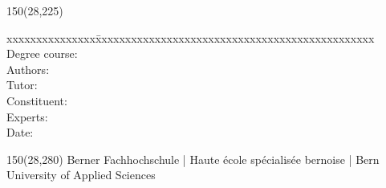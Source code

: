 \begin{titlepage}
\begin{flushleft}
\begin{textblock}{150}(28,225)
\fontsize{10pt}{17pt}\selectfont
\begin{tabbing}
xxxxxxxxxxxxxxx\=xxxxxxxxxxxxxxxxxxxxxxxxxxxxxxxxxxxxxxxxxxxxxxx \kill
Degree course:		\\		%
Authors:				\\					%
Tutor:			\\							%
Constituent:	\> [Wwwww AG]					\\							%
Experts:						\\							%
Date:			\> \versiondate					\\							%
\end{tabbing}

\end{textblock}
\end{flushleft}

\begin{textblock}{150}(28,280)
\noindent 
\color{bfhgrey}\fontsize{9pt}{10pt}\selectfont
Berner Fachhochschule | Haute \'ecole sp\'ecialis\'ee bernoise | Bern University of Applied Sciences
\color{black}\selectfont
\end{textblock}


\end{titlepage}

%
%
